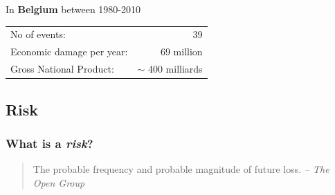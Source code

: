 \begin{frame}
\pause
\begin{exampleblock}{In {\bfseries Belgium} between 1980-2010}
\begin{center}
\begin{tabular}{lr}
No of events: & 39 \\
Economic damage per year: & 69 million \\
Gross National Product: & $\sim$ 400 milliards \\
\end{tabular}
\end{center}
\end{exampleblock}
\end{frame}

\subsection{Risk}

\begin{frame}
\frametitle{What is a \emph{risk}?}
\begin{quote}
The probable {\Large frequency} and probable {\Large magnitude} of {\Large
future loss}.
\textit{-- The Open Group}
\end{quote}
\end{frame}

